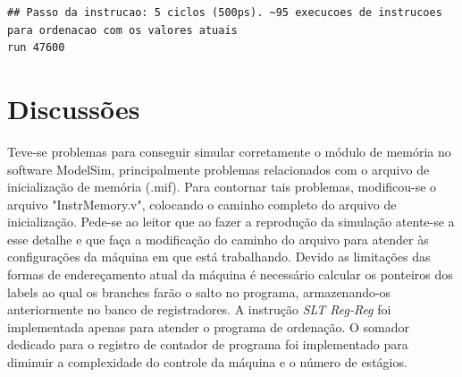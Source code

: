\documentclass[11pt,a4paper,titlepage]{article}
\begin{document}
\begin{lstlisting}
## Passo da instrucao: 5 ciclos (500ps). ~95 execucoes de instrucoes para ordenacao com os valores atuais
run 47600
\end{lstlisting}

\section{Discussões}

Teve-se problemas para conseguir simular corretamente o módulo de memória no software ModelSim, principalmente problemas relacionados com o arquivo de inicialização de memória (.mif). Para contornar tais problemas, modificou-se o arquivo "InstrMemory.v", colocando o caminho completo do arquivo de inicialização. Pede-se ao leitor que ao fazer a reprodução da simulação atente-se a esse detalhe e que faça a modificação do caminho do arquivo para atender às configurações da máquina em que está trabalhando.
Devido as limitações das formas de endereçamento atual da máquina é necessário calcular os ponteiros dos labels ao qual os branches farão o salto no programa, armazenando-os anteriormente no banco de registradores.
A instrução \textit{SLT Reg-Reg} foi implementada apenas para atender o programa de ordenação. O somador dedicado para o registro de contador de programa foi implementado para diminuir a complexidade do controle da máquina e o número de estágios.



%

\nocite{*}
\end{document}
